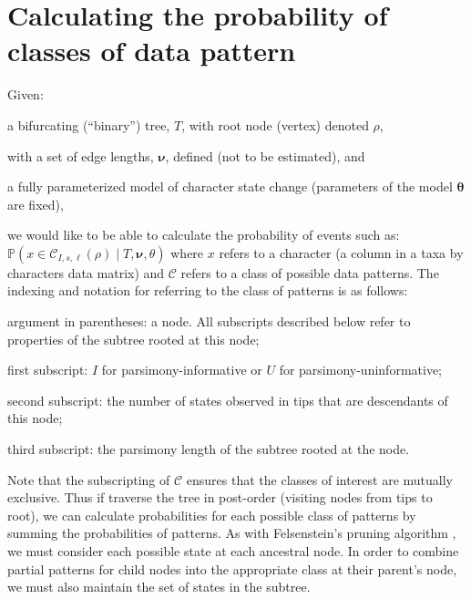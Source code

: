 \documentclass[11pt]{article}
\newcommand{\treeRoot}{\ensuremath{\rho}\xspace}
\newcommand{\parsLength}{\ensuremath{\ell}\xspace}
\newcommand{\numObserved}{\ensuremath{s}\xspace}
\newcommand{\inform}{\ensuremath{I}\xspace}
\newcommand{\uninform}{\ensuremath{U}\xspace}
\newcommand{\edgeLengths}{\ensuremath{\bm \nu}\xspace}
\newcommand{\patProbSym}{\ensuremath{\mathbb P}\xspace}
\renewcommand{\Pr}{\patProbSym}
\newcommand{\patClassSym}{\ensuremath{\mathcal C}\xspace}
\newcommand{\patClass}[3]{\ensuremath{\patClassSym_{#1,#2,#3}}\xspace}
\begin{document}
\section*{Calculating the probability of classes of data pattern}
Given:
\begin{compactitem}
	\item a bifurcating (``binary'') tree, $T$, with root node (vertex) denoted \treeRoot,
	\item with a set of edge lengths, \edgeLengths, defined (not to be estimated), and
	\item  a fully parameterized model of character state change (parameters of the model $\bm\theta$ are fixed),
\end{compactitem}
we would like to be able to calculate the probability of events such as: $\Pr(x\in\patClass{\inform}{\numObserved}{\parsLength}(\treeRoot) \mid T, \edgeLengths, \theta)$ where $x$ refers to a character (a column in a taxa by characters data matrix) and \patClassSym refers to a class of possible data patterns.
The indexing and notation for referring to the class of patterns is as follows:
\begin{compactitem}
	\item argument in parentheses: a node. All subscripts described below refer to properties of the subtree rooted at this node;
	\item first subscript: \inform for parsimony-informative or \uninform for parsimony-uninformative;
	\item second subscript: the number of states observed in tips that are descendants of this node;
	\item third subscript: the parsimony length of the subtree rooted at the node.
\end{compactitem}

Note that the subscripting of \patClassSym ensures that the classes of interest are mutually exclusive.
Thus if traverse the tree in post-order (visiting nodes from tips to root), we can calculate probabilities for each possible class of patterns by summing the probabilities of patterns.
As with Felsenstein's pruning algorithm \citep{Felsenstein1981a}, we must consider each possible state at each ancestral node.
In order to combine partial patterns for child nodes into the appropriate class at their parent's node, we must also maintain the set of states in the subtree.
\end{document}
